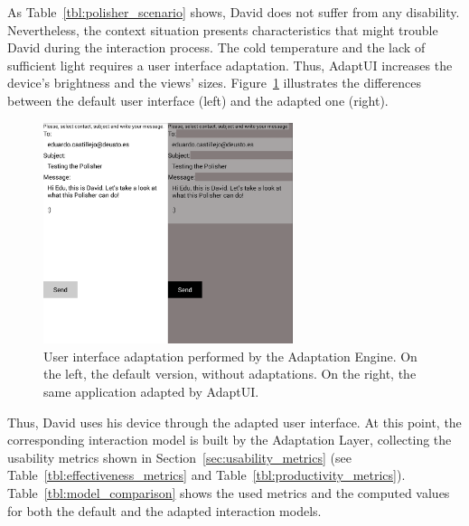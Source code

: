 As Table~\ref{tbl:polisher_scenario} shows, David does not suffer from any
disability. Nevertheless, the context situation presents characteristics that
might trouble David during the interaction process. The cold temperature and the
lack of sufficient light requires a user interface adaptation. Thus, AdaptUI
increases the device's brightness and the views' sizes. 
Figure~\ref{fig:polisher_scenario} illustrates the differences between the 
default user interface (left) and the adapted one (right).

\begin{figure}
\centering
\includegraphics[width=0.65\textwidth]{polisher_scenario.pdf}
\caption{User interface adaptation performed by the Adaptation Engine. On the
left, the default version, without adaptations. On the right, the same 
application adapted by AdaptUI.}
\label{fig:polisher_scenario}
\end{figure}

Thus, David uses his device through the adapted user interface. At this point,
the corresponding interaction model is built by the Adaptation Layer, collecting
the usability metrics shown in Section~\ref{sec:usability_metrics} (see 
Table~\ref{tbl:effectiveness_metrics} and Table~\ref{tbl:productivity_metrics}).
Table~\ref{tbl:model_comparison} shows the used metrics and the computed values
for both the default and the adapted interaction models.

